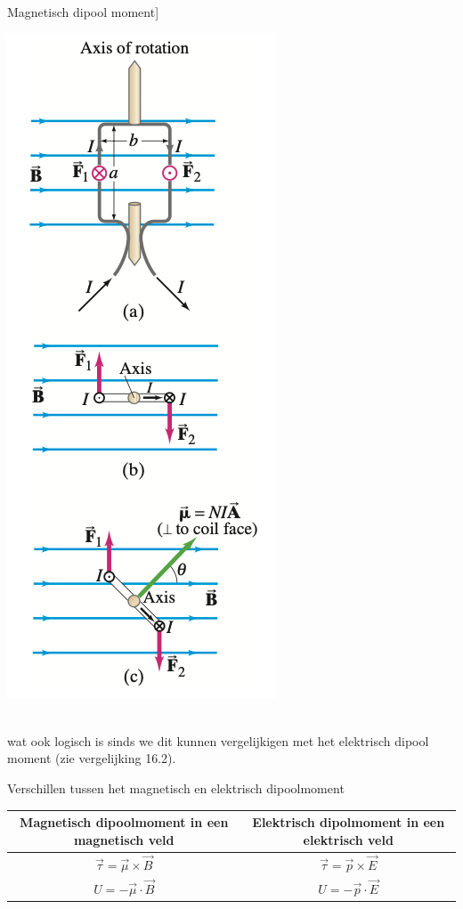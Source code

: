 \begin{theo}{Magnetisch dipool moment]}
    \begin{minipage}{.2\textwidth}
        \includegraphics[scale = 0.35]{Images/Magnetisme/MagnetischDipoolMoment}
    \end{minipage}
    \vspace{0.2cm} \\
    wat ook logisch is sinds we dit kunnen vergelijkigen met het elektrisch dipool moment (zie vergelijking 16.2).
\end{theo}

\begin{vrg}{Verschillen tussen het magnetisch en elektrisch dipoolmoment}
    \vspace{-0.3cm}
    \def\arraystretch{2}
    \centering
    \begin{tabular}{c|c}
       Magnetisch dipoolmoment in een magnetisch veld & Elektrisch dipolmoment in een elektrisch veld \\ \hline
        $\Vec{\tau} = \Vec{\mu} \times \Vec{B}$ & $\Vec{\tau} = \Vec{p} \times \Vec{E}$ \\ \hline
        $U = -\Vec{\mu} \cdot \Vec{B}$ & $U = -\Vec{p} \cdot \Vec{E}$ \\
    \end{tabular}
\end{vrg}

